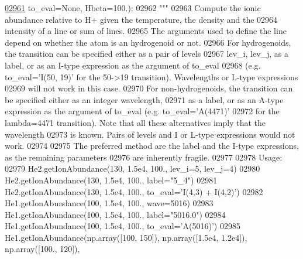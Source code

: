 \begin{DoxyCode}
\hypertarget{classpyneb_1_1core_1_1pynebcore_1_1_rec_atom_l02961}{}\hyperlink{classpyneb_1_1core_1_1pynebcore_1_1_rec_atom_a250ec6b99eedd84bdb8eae97cbd4beef}{02961}                         to\_eval=\textcolor{keywordtype}{None}, Hbeta=100.):
02962         \textcolor{stringliteral}{"""}
02963 \textcolor{stringliteral}{        Compute the ionic abundance relative to H+ given the temperature, the density and the }
02964 \textcolor{stringliteral}{            intensity of a line or sum of lines.}
02965 \textcolor{stringliteral}{        The arguments used to define the line depend on whether the atom is an hydrogenoid or not. }
02966 \textcolor{stringliteral}{        For hydrogenoids, the transition can be specified either as a pair of levels }
02967 \textcolor{stringliteral}{            lev\_i, lev\_j, as a label, or as an I-type expression as the argument of to\_eval }
02968 \textcolor{stringliteral}{            (e.g. to\_eval='I(50, 19)' for the 50->19 transition). Wavelengths or L-type expressions }
02969 \textcolor{stringliteral}{            will not work in this case. }
02970 \textcolor{stringliteral}{        For non-hydrogenoids, the transition can be specified either as an integer wavelength, }
02971 \textcolor{stringliteral}{            as a label, or as an A-type expression as the argument of to\_eval (e.g. to\_eval='A(4471)' }
02972 \textcolor{stringliteral}{            for the lambda=4471 transition). Note that all these alternatives imply that the wavelength}
02973 \textcolor{stringliteral}{            is known. Pairs of levels and I or L-type expressions would not work.}
02974 \textcolor{stringliteral}{}
02975 \textcolor{stringliteral}{        The preferred method are the label and the I-type expressions, as the remaining parameters }
02976 \textcolor{stringliteral}{            are inherently fragile.}
02977 \textcolor{stringliteral}{}
02978 \textcolor{stringliteral}{        Usage:}
02979 \textcolor{stringliteral}{            He2.getIonAbundance(130, 1.5e4, 100., lev\_i=5, lev\_j=4)}
02980 \textcolor{stringliteral}{            He2.getIonAbundance(130, 1.5e4, 100., label="5\_4")}
02981 \textcolor{stringliteral}{            He2.getIonAbundance(130, 1.5e4, 100., to\_eval='I(4,3) + I(4,2)')}
02982 \textcolor{stringliteral}{            He1.getIonAbundance(100, 1.5e4, 100., wave=5016)}
02983 \textcolor{stringliteral}{            He1.getIonAbundance(100, 1.5e4, 100., label="5016.0")}
02984 \textcolor{stringliteral}{            He1.getIonAbundance(100, 1.5e4, 100., to\_eval='A(5016)')}
02985 \textcolor{stringliteral}{            He1.getIonAbundance(np.array([100, 150]), np.array([1.5e4, 1.2e4]), np.array([100., 120]), }

\end{DoxyCode}
